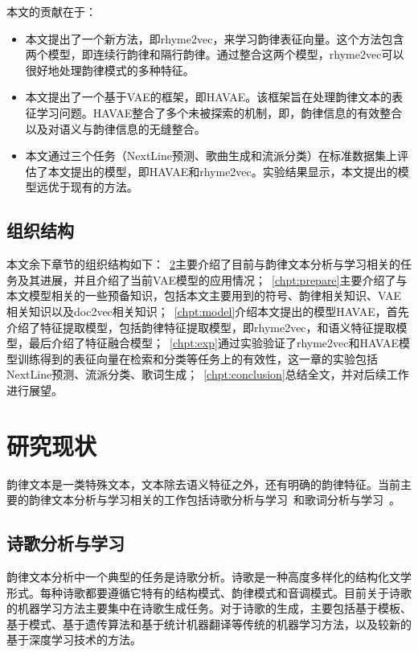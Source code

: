 本文的贡献在于：
\begin{itemize}
  \item 本文提出了一个新方法，即rhyme2vec，来学习韵律表征向量。这个方法包含两个模型，即连续行韵律和隔行韵律。通过整合这两个模型，rhyme2vec可以很好地处理韵律模式的多种特征。
  \item 本文提出了一个基于VAE的框架，即HAVAE。该框架旨在处理韵律文本的表征学习问题。HAVAE整合了多个未被探索的机制，即，韵律信息的有效整合以及对语义与韵律信息的无缝整合。
  \item 本文通过三个任务（NextLine预测、歌曲生成和流派分类）在标准数据集上评估了本文提出的模型，即HAVAE和rhyme2vec。实验结果显示，本文提出的模型远优于现有的方法。
\end{itemize}

\section{组织结构}
本文余下章节的组织结构如下：~\ref{chpt:relat}主要介绍了目前与韵律文本分析与学习相关的任务及其进展，并且介绍了当前VAE模型的应用情况；~\ref{chpt:prepare}主要介绍了与本文模型相关的一些预备知识，包括本文主要用到的符号、韵律相关知识、VAE相关知识以及doc2vec相关知识；~\ref{chpt:model}介绍本文提出的模型HAVAE，首先介绍了特征提取模型，包括韵律特征提取模型，即rhyme2vec，和语义特征提取模型，最后介绍了特征融合模型；~\ref{chpt:exp}通过实验验证了rhyme2vec和HAVAE模型训练得到的表征向量在检索和分类等任务上的有效性，这一章的实验包括NextLine预测、流派分类、歌词生成；~\ref{chpt:conclusion}总结全文，并对后续工作进行展望。\par

\chapter{研究现状} \label{chpt:relat}
韵律文本是一类特殊文本，文本除去语义特征之外，还有明确的韵律特征。当前主要的韵律文本分析与学习相关的工作包括诗歌分析与学习~\autocite{oliveira2012poetryme,kurzweil2001ray,jiang2015jiyu,he2012generating,mikolov2010recurrent,zhang2014chinese}和歌词分析与学习~\autocite{hu2009lyric,he2008language,hirjee2009automatic,wu2013learning}。

\section{诗歌分析与学习}
韵律文本分析中一个典型的任务是诗歌分析。诗歌是一种高度多样化的结构化文学形式。每种诗歌都要遵循它特有的结构模式、韵律模式和音调模式。目前关于诗歌的机器学习方法主要集中在诗歌生成任务。对于诗歌的生成，主要包括基于模板、基于模式、基于遗传算法和基于统计机器翻译等传统的机器学习方法，以及较新的基于深度学习技术的方法。\par


